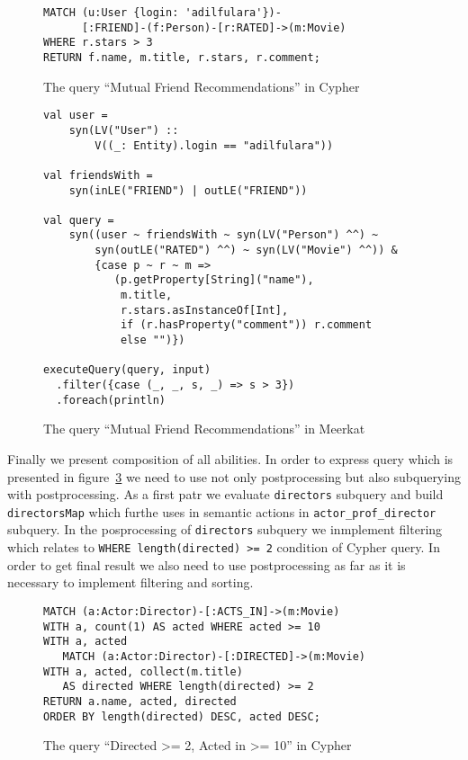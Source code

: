 \begin{figure}[h]
\begin{lstlisting}
MATCH (u:User {login: 'adilfulara'})-
      [:FRIEND]-(f:Person)-[r:RATED]->(m:Movie)
WHERE r.stars > 3
RETURN f.name, m.title, r.stars, r.comment;
\end{lstlisting}
\caption{The query ``Mutual Friend Recommendations'' in Cypher}
\label{fig:Q4_C}
\end{figure}


\begin{figure}[h]
\begin{lstlisting}
val user = 
    syn(LV("User") :: 
        V((_: Entity).login == "adilfulara"))

val friendsWith = 
    syn(inLE("FRIEND") | outLE("FRIEND"))

val query = 
    syn((user ~ friendsWith ~ syn(LV("Person") ^^) ~
        syn(outLE("RATED") ^^) ~ syn(LV("Movie") ^^)) &
        {case p ~ r ~ m => 
           (p.getProperty[String]("name"), 
            m.title, 
            r.stars.asInstanceOf[Int],
            if (r.hasProperty("comment")) r.comment 
            else "")})
 
executeQuery(query, input)
  .filter({case (_, _, s, _) => s > 3})
  .foreach(println)

\end{lstlisting}
\caption{The query ``Mutual Friend Recommendations'' in Meerkat}
\label{fig:Q4_M}
\end{figure}


Finally we present composition of all abilities.
In order to express query which is presented in figure~\ref{fig:Q3_C} we need to use not only postprocessing but also subquerying with postprocessing.
As a first patr we evaluate \lstinline{directors} subquery and build \lstinline{directorsMap} which furthe uses in semantic actions in \lstinline{actor_prof_director} subquery.
In the posprocessing of \lstinline{directors} subquery we inmplement filtering which relates to \lstinline{WHERE length(directed) >= 2} condition of Cypher query.
In order to get final result we also need to use postprocessing as far as it is necessary to implement filtering and sorting.

\begin{figure}[h]
\begin{lstlisting}
MATCH (a:Actor:Director)-[:ACTS_IN]->(m:Movie)
WITH a, count(1) AS acted WHERE acted >= 10
WITH a, acted 
   MATCH (a:Actor:Director)-[:DIRECTED]->(m:Movie)
WITH a, acted, collect(m.title) 
   AS directed WHERE length(directed) >= 2
RETURN a.name, acted, directed
ORDER BY length(directed) DESC, acted DESC;
\end{lstlisting}
\caption{The query ``Directed >= 2, Acted in >= 10'' in Cypher}
\label{fig:Q3_C}
\end{figure}


